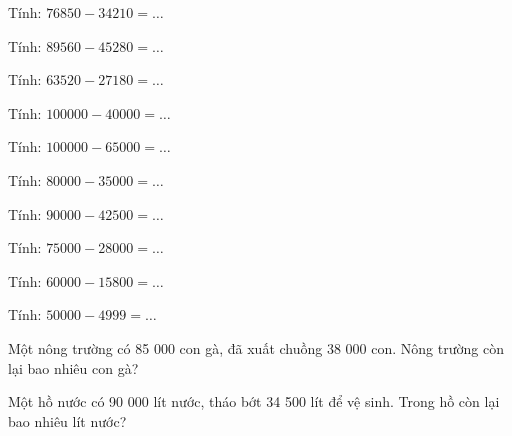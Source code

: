 \begin{ex}
Tính: $76850 - 34210 = \dots$
\end{ex}

\begin{ex}
Tính: $89560 - 45280 = \dots$
\end{ex}

\begin{ex}
Tính: $63520 - 27180 = \dots$
\end{ex}

\begin{ex}
Tính: $100000 - 40000 = \dots$
\end{ex}

\begin{ex}
Tính: $100000 - 65000 = \dots$
\end{ex}

\begin{ex}
Tính: $80000 - 35000 = \dots$
\end{ex}

\begin{ex}
Tính: $90000 - 42500 = \dots$
\end{ex}

\begin{ex}
Tính: $75000 - 28000 = \dots$
\end{ex}

\begin{ex}
Tính: $60000 - 15800 = \dots$
\end{ex}

\begin{ex}
Tính: $50000 - 4999 = \dots$
\end{ex}

\begin{ex}
Một nông trường có 85 000 con gà, đã xuất chuồng 38 000 con. Nông trường còn lại bao nhiêu con gà?
\end{ex}

\begin{ex}
Một hồ nước có 90 000 lít nước, tháo bớt 34 500 lít để vệ sinh. Trong hồ còn lại bao nhiêu lít nước?
\end{ex}

